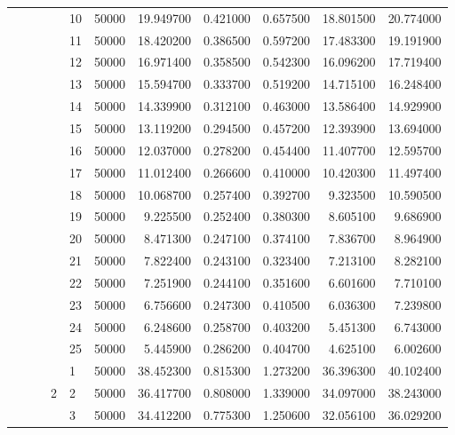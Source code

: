 \begin{tabular}{llllllrrrrr}
\cline{5-11}
 &  &  &  & 10 & 50000 & 19.949700 & 0.421000 & 0.657500 & 18.801500 & 20.774000 \\
\cline{5-11}
 &  &  &  & 11 & 50000 & 18.420200 & 0.386500 & 0.597200 & 17.483300 & 19.191900 \\
\cline{5-11}
 &  &  &  & 12 & 50000 & 16.971400 & 0.358500 & 0.542300 & 16.096200 & 17.719400 \\
\cline{5-11}
 &  &  &  & 13 & 50000 & 15.594700 & 0.333700 & 0.519200 & 14.715100 & 16.248400 \\
\cline{5-11}
 &  &  &  & 14 & 50000 & 14.339900 & 0.312100 & 0.463000 & 13.586400 & 14.929900 \\
\cline{5-11}
 &  &  &  & 15 & 50000 & 13.119200 & 0.294500 & 0.457200 & 12.393900 & 13.694000 \\
\cline{5-11}
 &  &  &  & 16 & 50000 & 12.037000 & 0.278200 & 0.454400 & 11.407700 & 12.595700 \\
\cline{5-11}
 &  &  &  & 17 & 50000 & 11.012400 & 0.266600 & 0.410000 & 10.420300 & 11.497400 \\
\cline{5-11}
 &  &  &  & 18 & 50000 & 10.068700 & 0.257400 & 0.392700 & 9.323500 & 10.590500 \\
\cline{5-11}
 &  &  &  & 19 & 50000 & 9.225500 & 0.252400 & 0.380300 & 8.605100 & 9.686900 \\
\cline{5-11}
 &  &  &  & 20 & 50000 & 8.471300 & 0.247100 & 0.374100 & 7.836700 & 8.964900 \\
\cline{5-11}
 &  &  &  & 21 & 50000 & 7.822400 & 0.243100 & 0.323400 & 7.213100 & 8.282100 \\
\cline{5-11}
 &  &  &  & 22 & 50000 & 7.251900 & 0.244100 & 0.351600 & 6.601600 & 7.710100 \\
\cline{5-11}
 &  &  &  & 23 & 50000 & 6.756600 & 0.247300 & 0.410500 & 6.036300 & 7.239800 \\
\cline{5-11}
 &  &  &  & 24 & 50000 & 6.248600 & 0.258700 & 0.403200 & 5.451300 & 6.743000 \\
\cline{5-11}
 &  &  &  & 25 & 50000 & 5.445900 & 0.286200 & 0.404700 & 4.625100 & 6.002600 \\
\cline{4-11} \cline{5-11}
 &  &  & \multirow[t]{25}{*}{2} & 1 & 50000 & 38.452300 & 0.815300 & 1.273200 & 36.396300 & 40.102400 \\
\cline{5-11}
 &  &  &  & 2 & 50000 & 36.417700 & 0.808000 & 1.339000 & 34.097000 & 38.243000 \\
\cline{5-11}
 &  &  &  & 3 & 50000 & 34.412200 & 0.775300 & 1.250600 & 32.056100 & 36.029200 \\

\end{tabular}

